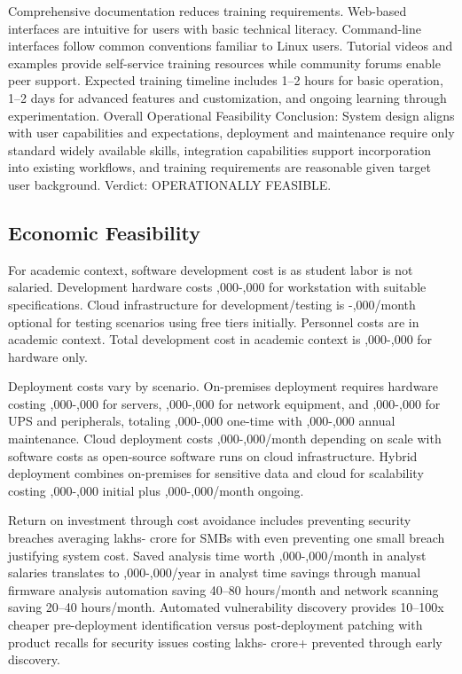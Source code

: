 Comprehensive documentation reduces training requirements. Web-based interfaces are intuitive for users with basic technical literacy. Command-line interfaces follow common conventions familiar to Linux users. Tutorial videos and examples provide self-service training resources while community forums enable peer support. Expected training timeline includes 1--2 hours for basic operation, 1--2 days for advanced features and customization, and ongoing learning through experimentation. Overall Operational Feasibility Conclusion: System design aligns with user capabilities and expectations, deployment and maintenance require only standard widely available skills, integration capabilities support incorporation into existing workflows, and training requirements are reasonable given target user background. Verdict: OPERATIONALLY FEASIBLE.

\subsection{Economic Feasibility}

For academic context, software development cost is  as student labor is not salaried. Development hardware costs ,000-,000 for workstation with suitable specifications. Cloud infrastructure for development/testing is -,000/month optional for testing scenarios using free tiers initially. Personnel costs are  in academic context. Total development cost in academic context is ,000-,000 for hardware only.

Deployment costs vary by scenario. On-premises deployment requires hardware costing ,000-,000 for servers, ,000-,000 for network equipment, and ,000-,000 for UPS and peripherals, totaling ,000-,000 one-time with ,000-,000 annual maintenance. Cloud deployment costs ,000-,000/month depending on scale with  software costs as open-source software runs on cloud infrastructure. Hybrid deployment combines on-premises for sensitive data and cloud for scalability costing ,000-,000 initial plus ,000-,000/month ongoing.

Return on investment through cost avoidance includes preventing security breaches averaging  lakhs- crore for SMBs with even preventing one small breach justifying system cost. Saved analysis time worth ,000-,000/month in analyst salaries translates to ,000-,000/year in analyst time savings through manual firmware analysis automation saving 40--80 hours/month and network scanning saving 20--40 hours/month. Automated vulnerability discovery provides 10--100x cheaper pre-deployment identification versus post-deployment patching with product recalls for security issues costing  lakhs- crore+ prevented through early discovery.

